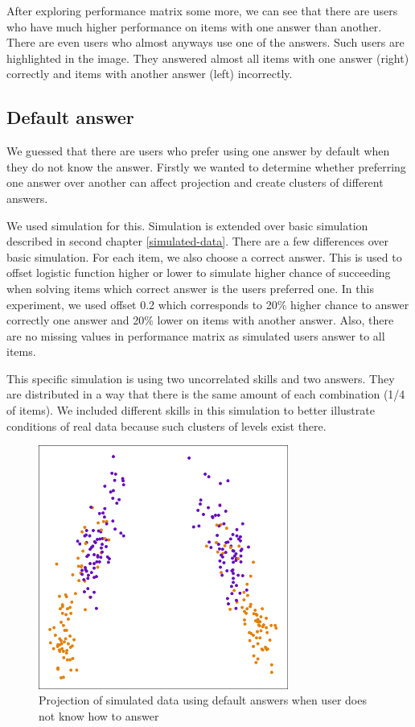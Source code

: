 \documentclass[
  digital, %
  table,   %
  nolof,     %
  nolot,     %
  nocover,
  color,
  final, %
]{fithesis3}
\begin{document}
After exploring performance matrix some more, we can see that there are users who have much higher performance on items with one answer than another. There are even users who almost anyways use one of the answers. Such users are highlighted in the image. They answered almost all items with one answer (right) correctly and items with another answer (left) incorrectly.


\subsection{Default answer}\label{default-answer}

We guessed that there are users who prefer using one answer by default when they do not know the answer. Firstly we wanted to determine whether preferring one answer over another can affect projection and create clusters of different answers.

We used simulation for this. Simulation is extended over basic simulation described in second chapter \ref{simulated-data}. There are a few differences over basic simulation. For each item, we also choose a correct answer. This is used to offset logistic function higher or lower to simulate higher chance of succeeding when solving items which correct answer is the users preferred one. In this experiment, we used offset 0.2 which corresponds to 20\% higher chance to answer correctly one answer and 20\% lower on items with another answer. Also, there are no missing values in performance matrix as simulated users answer to all items.

This specific simulation is using two uncorrelated skills and two answers. They are distributed in a way that there is the same amount of each combination (1/4 of items). We included different skills in this simulation to better illustrate conditions of real data because such clusters of levels exist there.

\begin{figure}
  \includegraphics[height=8cm]{img/simulated_default}
  \caption{Projection of simulated data using default answers when user does not know how to answer}
  \label{fig:simulated_default}
\end{figure}
\end{document}

